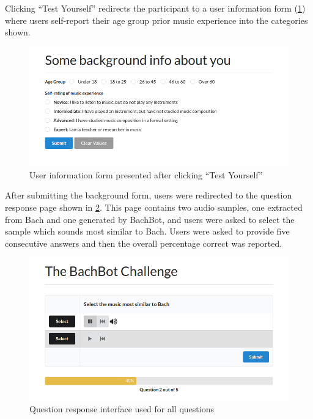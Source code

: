 Clicking ``Test Yourself'' redirects the participant to a user information form
(\cref{fig:user-info-form}) where users self-report their age
group prior music experience into the categories shown.

\begin{figure}[tb]
  \centering
  \includegraphics[width=1.0\linewidth]{user-info-form.png}
  \caption{User information form presented after clicking ``Test Yourself''}
  \label{fig:user-info-form}
\end{figure}

After submitting the background form, users were redirected to the question
response page shown in \cref{fig:question-screen}. This page contains two
audio samples, one extracted from Bach and one generated by BachBot, and users
were asked to select the sample which sounds most similar to Bach. Users were
asked to provide five consecutive answers and then the overall percentage
correct was reported.

\begin{figure}[tb]
  \centering
  \includegraphics[width=1.0\linewidth]{question-screen.png}
  \caption{Question response interface used for all questions}
  \label{fig:question-screen}
\end{figure}

